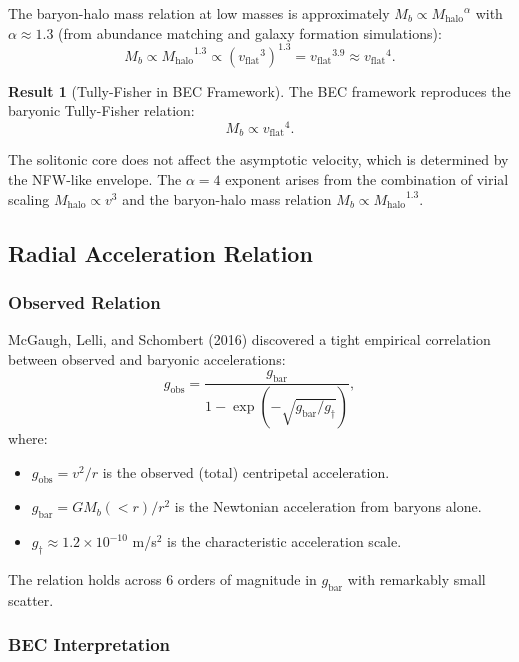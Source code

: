 \documentclass[11pt,a4paper]{article}
\newcommand{\Mhalo}{\ensuremath{M_{\mathrm{halo}}}}
\newcommand{\vflat}{\ensuremath{v_{\mathrm{flat}}}}
\newcommand{\gbar}{\ensuremath{g_{\mathrm{bar}}}}
\newcommand{\gobs}{\ensuremath{g_{\mathrm{obs}}}}
\newcommand{\gdagger}{\ensuremath{g_{\dagger}}}
\theoremstyle{definition}
\newtheorem{result}{Result}[section]
\theoremstyle{remark}
\begin{document}
The baryon-halo mass relation at low masses is approximately $M_b \propto \Mhalo^{\alpha}$ with $\alpha \approx 1.3$ (from abundance matching and galaxy formation simulations):
\begin{equation}
M_b \propto \Mhalo^{1.3} \propto (\vflat^3)^{1.3} = \vflat^{3.9} \approx \vflat^4.
\end{equation}

\begin{result}[Tully-Fisher in BEC Framework]
The BEC framework reproduces the baryonic Tully-Fisher relation:
\begin{equation}
\boxed{M_b \propto \vflat^4.}
\end{equation}

The solitonic core does not affect the asymptotic velocity, which is determined by the NFW-like envelope. The $\alpha = 4$ exponent arises from the combination of virial scaling $\Mhalo \propto v^3$ and the baryon-halo mass relation $M_b \propto \Mhalo^{1.3}$.
\end{result}

\subsection{Radial Acceleration Relation}
\label{sec:RAR}

\subsubsection{Observed Relation}

McGaugh, Lelli, and Schombert (2016) \cite{McGaugh2016} discovered a tight empirical correlation between observed and baryonic accelerations:
\begin{equation}
\label{eq:RAR}
\gobs = \frac{\gbar}{1 - \exp(-\sqrt{\gbar/\gdagger})},
\end{equation}
where:
\begin{itemize}[leftmargin=*]
\item $\gobs = v^2/r$ is the observed (total) centripetal acceleration.
\item $\gbar = GM_b(<r)/r^2$ is the Newtonian acceleration from baryons alone.
\item $\gdagger \approx 1.2 \times 10^{-10}$ m/s$^2$ is the characteristic acceleration scale.
\end{itemize}

The relation holds across 6 orders of magnitude in $\gbar$ with remarkably small scatter.

\subsubsection{BEC Interpretation}
\end{document}
